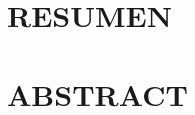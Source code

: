 \documentclass[
	11pt,			%
	letterpaper,	%
    twoside			%
]{thesis_utfsm}
\begin{document}
\sloppy 

\pagestyle{plain}           %


\frontmatter                %

\begin{comment}
 \dedicatoria{%
    \emph{\huge Dedicatoria \dots}

    \vspace*{2cm}[Puede ocupar este espacio para escribir una 
    dedicatoria (opcional). Revise el archivo maestro
    \inlinecode{memoria.tex}]
}%


\section*{(AGRADECIMIENTOS) [Título es opcional] }
\insertFile[empty]{agradecimientos} %
\end{comment}

\section*{RESUMEN}


\section*{ABSTRACT}


\begin{spacing}{1}      %
    \tableofcontents\listoftables\listoffigures
\end{spacing}



\mainmatter             
\end{document}
